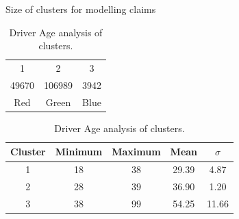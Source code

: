 \documentclass[11pt,letterpaper]{article}
\numberwithin{equation}{section}
\numberwithin{equation}{section}
\numberwithin{equation}{section}
\begin{document}
\begin{table}[!htb]
\caption{Claim Nb analysis of clusters}
\label{table:claimAn}
\begin{center}
\end{center}
\end{table}
\begin{table}[!htb]
\parbox{.45\linewidth}{
\centering
\label{table:2}
\caption{Size of clusters for modelling claims}
\begin{tabular}{ccc}
\hline\hline
1     & 2      & 3    \\
49670 & 106989 & 3942 \\
Red & Green & Blue \\
\hline\hline
\end{tabular}
}
\hfill
\parbox{.45\linewidth}{
\centering
\caption{Driver Age analysis of clusters.}
\label{table:driverFreq}
\begin{tabular}{ccccc}
\hline\hline
Cluster & Minimum & Maximum & Mean & $\sigma$  \\
\hline
 1 &  18 & 38 & 29.39 & 4.87 \\
 2 &  28 & 39 & 36.90 &   1.20 \\
 3 & 38  & 99 & 54.25 & 11.66 \\
 \hline\hline
\end{tabular}
}
\end{table}
\end{document}
